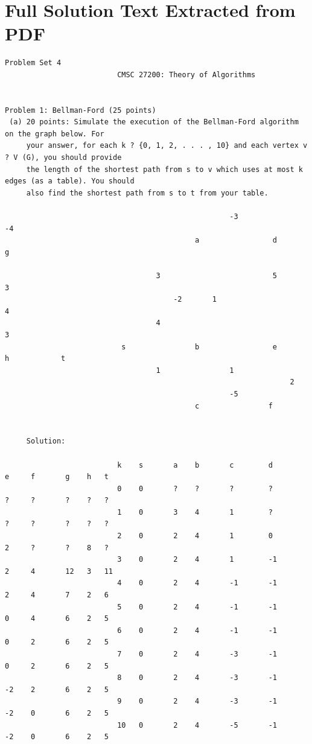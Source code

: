 \documentclass[12pt]{article}
\begin{document}
\section*{Full Solution Text Extracted from PDF}
\begin{Verbatim}[breaklines=true,fontsize=\small]
                                       Problem Set 4
                          CMSC 27200: Theory of Algorithms


Problem 1: Bellman-Ford (25 points)
 (a) 20 points: Simulate the execution of the Bellman-Ford algorithm on the graph below. For
     your answer, for each k ? {0, 1, 2, . . . , 10} and each vertex v ? V (G), you should provide
     the length of the shortest path from s to v which uses at most k edges (as a table). You should
     also find the shortest path from s to t from your table.

                                                    -3                 -4
                                            a                 d                 g

                                   3                          5        3
                                       -2       1                                   4
                                   4                                                     3
                           s                b                 e                 h            t
                                   1                1
                                                                  2
                                                    -5
                                            c                f


     Solution:

                          k    s       a    b       c        d        e     f       g    h   t
                          0    0       ?    ?       ?        ?        ?     ?       ?    ?   ?
                          1    0       3    4       1        ?        ?     ?       ?    ?   ?
                          2    0       2    4       1        0        2     ?       ?    8   ?
                          3    0       2    4       1        -1       2     4       12   3   11
                          4    0       2    4       -1       -1       2     4       7    2   6
                          5    0       2    4       -1       -1       0     4       6    2   5
                          6    0       2    4       -1       -1       0     2       6    2   5
                          7    0       2    4       -3       -1       0     2       6    2   5
                          8    0       2    4       -3       -1       -2    2       6    2   5
                          9    0       2    4       -3       -1       -2    0       6    2   5
                          10   0       2    4       -5       -1       -2    0       6    2   5


\end{Verbatim}
\end{document}

